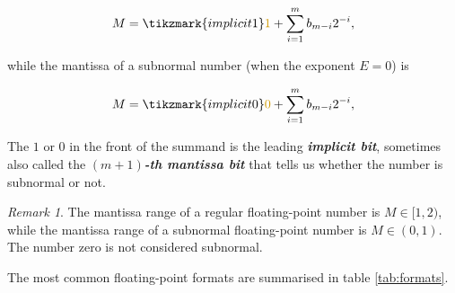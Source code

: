 \documentclass{article}
\theoremstyle{plain} %
\theoremstyle{convention} %
\theoremstyle{remark} %
\newtheorem*{remark}{Remark} %
\def\df#1{\textbf{\textit{#1}}}
\numberwithin{equation}{section}
\begin{document}
\begin{align*}
    M = \tikzmark{implicit1}\textcolor{cyellow}{1} + \sum_{i=1}^{m} b_{m-i} 2^{-i},
\end{align*}


while the mantissa of a subnormal number (when the exponent $E=0$) is

\begin{align*}
    M = \tikzmark{implicit0}\textcolor{cyellow}{0} + \sum_{i=1}^{m} b_{m-i} 2^{-i},
\end{align*}


The $1$ or $0$ in the front of the summand is the leading \df{\textcolor{cyellow}{implicit bit}}, sometimes also called the \df{$(m+1)$-th mantissa bit} that tells us whether the number is subnormal or not.

\begin{remark}
    The mantissa range of a regular floating-point number is $M \in [1, 2)$, while the mantissa range of a subnormal floating-point number is $M \in (0, 1)$. The number zero is not considered subnormal.
\end{remark}

The most common floating-point formats are summarised in table \ref{tab:formats}.
\end{document}
